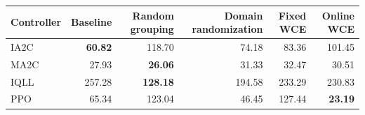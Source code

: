 \begin{tabular}{lrrrrr}
\hline
Controller & Baseline & Random grouping & Domain randomization & Fixed WCE & Online WCE \\
\hline
IA2C & \textbf{60.82} & 118.70 & 74.18 & 83.36 & 101.45 \\
MA2C & 27.93 & \textbf{26.06} & 31.33 & 32.47 & 30.51 \\
IQLL & 257.28 & \textbf{128.18} & 194.58 & 233.29 & 230.83 \\
PPO & 65.34 & 123.04 & 46.45 & 127.44 & \textbf{23.19} \\
\hline
\end{tabular}
